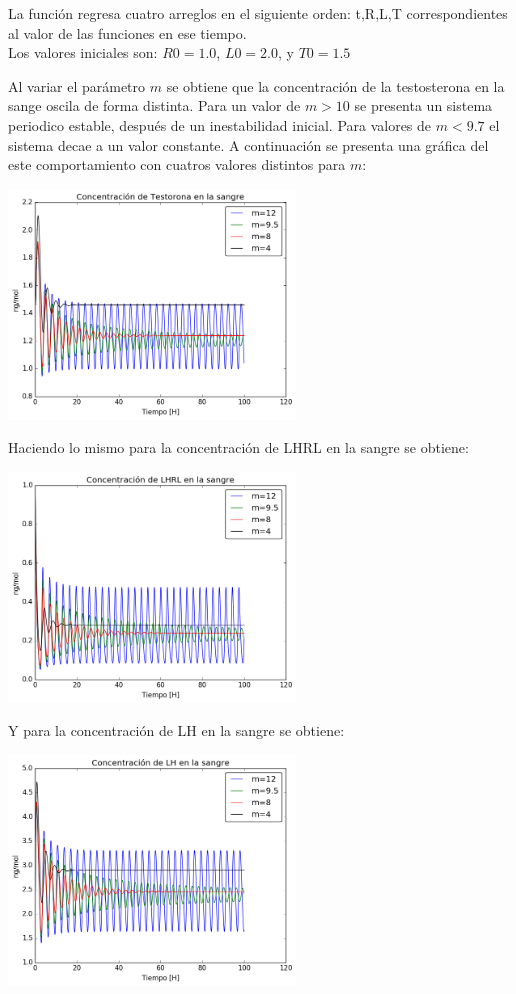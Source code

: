 \documentclass[letter,11pt]{article}
\begin{document}
La función regresa cuatro arreglos en el siguiente orden: t,R,L,T correspondientes al valor de las funciones en ese tiempo.\\

Los valores iniciales son: $R0 = 1.0$, $L0=2.0$, y $T0 = 1.5$

Al variar el parámetro $m$ se obtiene que la concentración de la testosterona en la sange oscila de forma distinta. Para un valor de $m>10$ se presenta un sistema periodico estable, después de un inestabilidad inicial. Para valores de $m<9.7$ el sistema decae a un valor constante. A continuación se presenta una gráfica del este comportamiento con cuatros valores distintos para $m$: 

\begin{center}
 \includegraphics[width=3in]{imagenes/Graficas/testosterona1.png}
\end{center}

Haciendo lo mismo para la concentración de LHRL en la sangre se obtiene:

\begin{center}
 \includegraphics[width=3in]{imagenes/Graficas/LHRL1.png}
\end{center}

Y para la concentración de LH en la sangre se obtiene:

\begin{center}
 \includegraphics[width=3in]{imagenes/Graficas/LH1.png}
\end{center}
\end{document}
